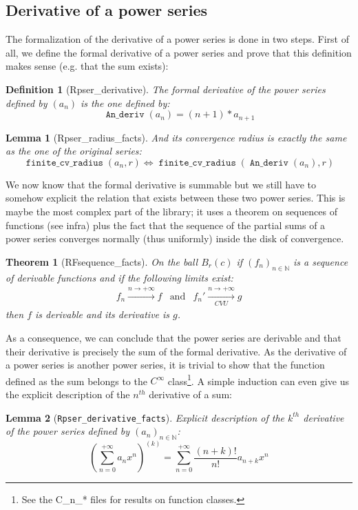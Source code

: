 \documentclass[submission,copyright]{eptcs}
\newcommand{\N}{\mathbb{N}}
\DeclareMathOperator{\D}{\mathtt{An\_deriv}}
\DeclareMathOperator{\fcvr}{\mathtt{finite\_cv\_radius}}
\newtheorem{definition}{Definition}
\newtheorem{lemma}{Lemma}
\newtheorem{theorem}{Theorem}
\begin{document}
\subsection{Derivative of a power series}

The formalization of the derivative of a power series is done in two steps.
First of all, we define the formal derivative of a power series and prove
that this definition makes sense (e.g. that the sum exists):

\begin{definition}[Rpser\_derivative] The formal derivative of the power
series defined by $(a_n)$ is the one defined by:
$$\D{}(a_n) = (n + 1) * a_{n+1}$$
\end{definition}

\begin{lemma}[Rpser\_radius\_facts] And its convergence radius is exactly
the same as the one of the original series: $$\fcvr{}(a_n,r) \Leftrightarrow
\fcvr{}(\D{}(a_n),r)$$\end{lemma}

We now know that the formal derivative is summable but we still have to
somehow explicit the relation that exists between these two power series.
This is maybe the most complex part of the library; it uses a theorem on
sequences of functions (see infra) plus the fact that the sequence of
the partial sums of a power series converges normally (thus uniformly)
inside the disk of convergence.

\begin{theorem}[RFsequence\_facts] On the ball $B_r(c)$ if
$(f_n)_{n \in \N}$ is a sequence of derivable functions and if the
following limits exist: $$ \begin{array}{ccc}
f_n \xrightarrow{n \to +\infty} f & \text{and} &
f_n' \xrightarrow[CVU]{n \to +\infty} g\end{array}$$ then $f$ is
derivable and its derivative is $g$.\end{theorem}

As a consequence, we can conclude that the power series are derivable
and that their derivative is precisely the sum of the formal derivative.
As the derivative of a power series is another power series, it is
trivial to show that the function defined as the sum belongs to the
$C^{\infty}$ class\footnote{See the C\_n\_* files for results on
function classes.}. A simple induction can even give us the explicit
description of the $n^{th}$ derivative of a sum:

\begin{lemma}[\texttt{Rpser\_derivative\_facts}] Explicit description of
the $k^{th}$ derivative of the power series defined by $(a_n)_{n\in \N}$:
$$(\sum_{n=0}^{+\infty} a_n x^n)^{(k)} = \sum_{n=0}^{+\infty}
\frac{(n + k)!}{n!} a_{n+k} x^n$$
\end{lemma}
\end{document}
